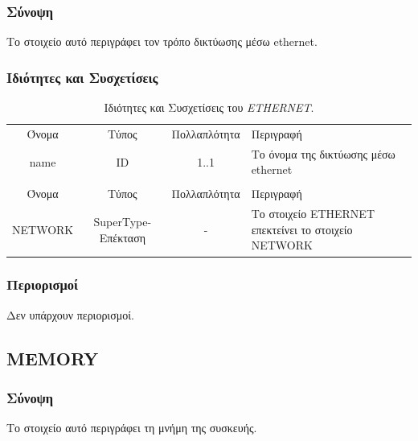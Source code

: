 \subsubsection*{Σύνοψη}

\noindent Το στοιχείο αυτό περιγράφει τον τρόπο δικτύωσης μέσω ethernet.

\subsubsection*{Ιδιότητες και Συσχετίσεις}

\begin{table}[H]
	\begin{center}
		\begin{tabular}{ | c | c | c| m{5.5cm} | }
			\hline
			\rowcolor{Gray}
			\multicolumn{4}{|c|}{\textbf{Ιδιότητες}}\\
			\hline
			\rowcolor{Gray}
			Όνομα & Τύπος & Πολλαπλότητα & Περιγραφή \\
			\hline
			name & ID & 1..1 & Το όνομα της δικτύωσης μέσω ethernet \\
			\hline
			\rowcolor{Gray}
			\multicolumn{4}{|c|}{\textbf{Συσχετίσεις}}\\
			\hline
			\rowcolor{Gray}
			Όνομα & Τύπος & Πολλαπλότητα & Περιγραφή \\
			\hline
			NETWORK & SuperType-Επέκταση & - &  Το στοιχείο ETHERNET επεκτείνει το στοιχείο NETWORK \\
			\hline
		\end{tabular}
		\caption{Ιδιότητες και Συσχετίσεις του \textit{ETHERNET}.}
		\label{tab:ethernet}
	\end{center}
\end{table}

\subsubsection*{Περιορισμοί}

\noindent Δεν υπάρχουν περιορισμοί.

\subsection{MEMORY}
\label{subsec:memory}

\subsubsection*{Σύνοψη}

\noindent Το στοιχείο αυτό περιγράφει τη μνήμη της συσκευής.

